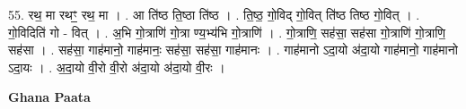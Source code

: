 \documentclass[17pt]{extarticle}
\begin{document}
55. रथ॒ मा रथꣳ॒॒ रथ॒ मा । . आ ति॑ष्ठ ति॒ष्ठा ति॑ष्ठ । . ति॒ष्ठ॒ गो॒विद् गो॒वित् ति॑ष्ठ तिष्ठ गो॒वित् । . गो॒विदिति॑ गो - वित् । . अ॒भि गो॒त्राणि॑ गो॒त्रा ण्य॒भ्य॑भि गो॒त्राणि॑ । . गो॒त्राणि॒ सह॑सा॒ सह॑सा गो॒त्राणि॑ गो॒त्राणि॒ सह॑सा । . सह॑सा॒ गाह॑मानो॒ गाह॑मानः॒ सह॑सा॒ सह॑सा॒ गाह॑मानः । . गाह॑मानो ऽदा॒यो अ॑दा॒यो गाह॑मानो॒ गाह॑मानो ऽदा॒यः । . अ॒दा॒यो वी॒रो वी॒रो अ॑दा॒यो अ॑दा॒यो वी॒रः । \newline

\textbf{Ghana Paata } \newline
\end{document}
